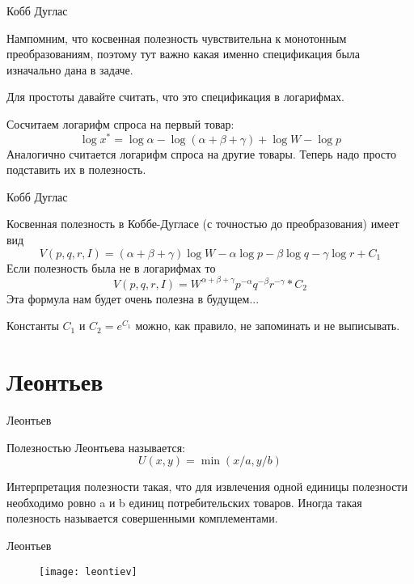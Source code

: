\documentclass{beamer}
\begin{document}
\begin{frame}{Кобб Дуглас}

Нампомним, что косвенная полезность чувствительна к монотонным преобразованиям, поэтому тут важно какая именно спецификация была изначально дана в задаче. 

Для простоты давайте считать, что это спецификация в логарифмах.

Сосчитаем логарифм спроса на первый товар:
$$\log x^{\ast} = \log \alpha - \log (\alpha + \beta + \gamma) + \log W - \log p$$
Аналогично считается логарифм спроса на другие товары. Теперь надо просто подставить их в полезность.

\end{frame}

\begin{frame}{Кобб Дуглас}

Косвенная полезность в Коббе-Дугласе (с точностью до преобразования) имеет вид
$$V(p,q,r,I) = (\alpha + \beta + \gamma) \log W - \alpha \log p - \beta \log q - \gamma \log r + C_1 $$
Если полезность была не в логарифмах то
$$V(p,q,r,I) = W^{\alpha + \beta + \gamma}p^{ - \alpha}q^{ - \beta }r^{- \gamma} * C_2 $$
Эта формула нам будет очень полезна в будущем...

Константы $C_1$ и $C_2=e^{C_1}$ можно, как правило, не запоминать и не выписывать.

\end{frame}

\section{Леонтьев}

\begin{frame}{Леонтьев}

\begin{definition}
Полезностью \alert{Леонтьева} называется:
$$U(x, y) = \min(x/a, y/b)$$  
\end{definition}

Интерпретация полезности такая, что для извлечения одной единицы полезности необходимо ровно a и b единиц потребительских товаров. Иногда такая полезность называется \alert{совершенными комплементами}.

\end{frame}

\begin{frame}{Леонтьев}

\begin{figure}[hbt]
\centering
\texttt{[image: leontiev]}
\end{figure}

\end{frame}
\end{document}

